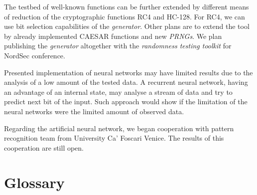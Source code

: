 \documentclass[
    digital,    %
    oneside,    %
    color,
    11pt,
    nocover,
    notable,
    nolof,
    nolot,
]{fithesis3}
\begin{document}
The testbed of well-known functions can be further extended by different means of reduction of the cryptographic functions RC4 and HC-128. For RC4, we can use bit selection capabilities of the \textit{generator}. Other plans are to extend the tool by already implemented CAESAR functions and new \textit{PRNGs}. We plan publishing the \textit{generator} altogether with the \textit{randomness testing toolkit} for NordSec conference.

Presented implementation of neural networks may have limited results due to the analysis of a low amount of the tested data. A recurrent neural network, having an advantage of an internal state, may analyse a stream of data and try to predict next bit of the input. Such approach would show if the limitation of the neural networks were the limited amount of observed data.

Regarding the artificial neural network, we began cooperation with pattern recognition team from University Ca’ Foscari Venice. The results of this cooperation are still open.



\printbibliography[heading=bibintoc] %

\appendix{}

\chapter{Glossary}
\label{chap:app-glos}
\end{document}
